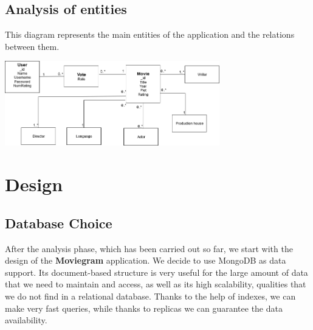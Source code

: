 \documentclass[a4paper, oneside]{article}
\begin{document}
\subsection{Analysis of entities}
This diagram represents the main entities of the application and the relations between them.
\begin{minipage}{\linewidth}
\begin{center}
\vspace{4mm}
\includegraphics[width = 0.7\textwidth]{./images/diagrams/Analysisuml} 
\vspace{2mm}
\label{fig:useCases}
\end{center}
\end{minipage}



\clearpage
\section{Design}

\subsection{Database Choice}
After the analysis phase, which has been carried out so far, we start with the design of the \textbf{Moviegram} application. We decide to use MongoDB as data support. Its document-based structure is very useful for the large amount of data that we need to maintain and access, as well as its high scalability, qualities that we do not find in a relational database. Thanks to the help of indexes, we can make very fast queries, while thanks to replicas we can guarantee the data availability.


\end{document}

